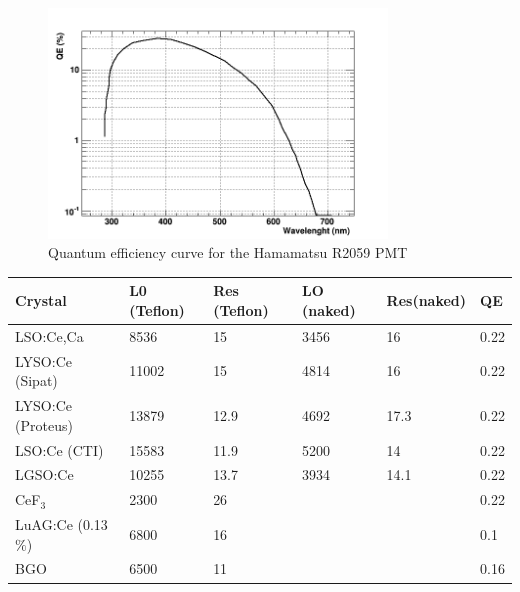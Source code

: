 \begin{figure}
\begin{center}
\includegraphics[width=9cm]{../Pictures/Chapter_5/qe.png}
\end{center}
\caption[QE of R2059 PMT]{Quantum efficiency curve for the Hamamatsu R2059 PMT}
\label{fig:QE}
\end{figure}

\begin{table}[h]
\begin{center}
\begin{tabular}{|l|l|l|l|l|l|}
\hline
Crystal  & L0 (Teflon) & Res (Teflon) & LO (naked) &  Res(naked) & QE\\
\hline
LSO:Ce,Ca& 8536&15 & 3456&16 &0.22\\
\hline
LYSO:Ce (Sipat)&11002 &15 &4814 &16&0.22\\
\hline
LYSO:Ce (Proteus)& 13879& 12.9 & 4692& 17.3&0.22\\
\hline
LSO:Ce (CTI)&15583 &11.9 &5200 &14&0.22\\
\hline
LGSO:Ce & 10255&13.7 &3934 &14.1&0.22\\
\hline
CeF$_{3}$&2300&26 & & &0.22\\
\hline
LuAG:Ce (0.13$\%$)&6800 &16 & & &0.1\\
\hline
BGO&6500 &11 & & &0.16\\
\hline
\end{tabular}
\end{center}
\label{table:LYtable}
\end{table}

